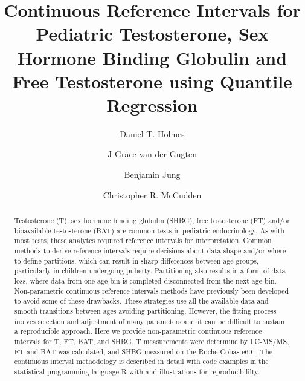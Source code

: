 \documentclass[]{elsarticle} %
\begin{document}
\begin{frontmatter}

  \title{Continuous Reference Intervals for Pediatric Testosterone, Sex
Hormone Binding Globulin and Free Testosterone using Quantile
Regression}
    \author[SPH,UBC]{Daniel T. Holmes}
    \author[SPH]{J Grace van der Gugten}
    \author[HSC]{Benjamin Jung}
    \author[UO,TOH,EORLA]{Christopher R. McCudden}
      \address[SPH]{St.~Paul's Hospital Department of Pathology and
Laboratory Medicine, 1081 Burrard St., Vancouver, BC V6Z 1Y6 Canada}
    \address[UBC]{University of British Columbia Department of Pathology
and Laboratory Medicine, 2211 Wesbrook Mall, Vancouver, BC V6T 1Z7
Canada}
    \address[TOH]{Department of Pathology and Laboratory Medicine,
Ottawa Hospital, General Campus, 501 Smyth Road, Ottawa, ON K1H 8L6
Canada}
    \address[UO]{Department of Pathology and Laboratory Medicine,
University of Ottawa}
    \address[EORLA]{Eastern Ontario Regional Laboratory Association}
    \address[HSC]{Hospital for Sick Children (SickKids), 555 University
Ave., Department of Paediatric Laboratory Medicine, Toronto, ON, M5G
1X8}
  
  \begin{abstract}
  Testosterone (T), sex hormone binding globulin (SHBG), free
  testosterone (FT) and/or bioavailable testosterone (BAT) are common
  tests in pediatric endocrinology. As with most tests, these analytes
  required reference intervals for interpretation. Common methods to
  derive reference intervals require decisions about data shape and/or
  where to define partitions, which can result in sharp differences
  between age groups, particularly in children undergoing puberty.
  Partitioning also results in a form of data loss, where data from one
  age bin is completed disconnected from the next age bin.
  Non-parametric continuous reference intervals methods have previously
  been developed to avoid some of these drawbacks. These strategies use
  all the available data and smooth transitions between ages avoiding
  partitioning. However, the fitting process inolves selection and
  adjustment of many parameters and it can be difficult to sustain a
  reproducible approach. Here we provide non-parametric continuous
  reference intervals for T, FT, BAT, and SHBG. T measurements were
  determine by LC-MS/MS, FT and BAT was calculated, and SHBG measured on
  the Roche Cobas e601. The continuous interval methodology is described
  in detail with code examples in the statistical programming language R
  with and illustrations for reproducibililty.
  \end{abstract}
  
 \end{frontmatter}
\end{document}
